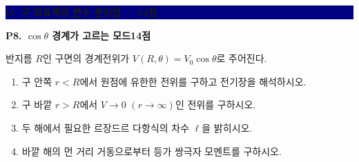 \documentclass[10pt,a4paper]{article}
\newcommand{\problem}[3]{%
  \needspace{0.18\textheight}
  \par\vspace{2.2mm}
  {\large\bfseries\color{navy}#1\hfill{\normalsize\color{blue}#2점}}\par
  \smallskip #3\par
}
\newcommand{\sectionbar}[1]{%
  \par\vspace{2.5mm}
  \colorbox{navy}{\parbox{0.965\linewidth}{\color{white}\bfseries\large #1}}
  \par\vspace{0.5mm}
}
\begin{document}
\sectionbar{D. 구 좌표계의 변수 분리법 · 14점}

\problem{P8. $\cos\theta$ 경계가 고르는 모드}{14}{%
반지름 $R$인 구면의 경계전위가 $V(R,\theta)=V_0\cos\theta$로 주어진다.
\begin{enumerate}[label=(\alph*)]
  \item 구 안쪽 $r<R$에서 원점에 유한한 전위를 구하고 전기장을 해석하시오.
  \item 구 바깥 $r>R$에서 $V\to0$ $(r\to\infty)$인 전위를 구하시오.
  \item 두 해에서 필요한 르장드르 다항식의 차수 $\ell$을 밝히시오.
  \item 바깥 해의 먼 거리 거동으로부터 등가 쌍극자 모멘트를 구하시오.
\end{enumerate}
}
\end{document}
